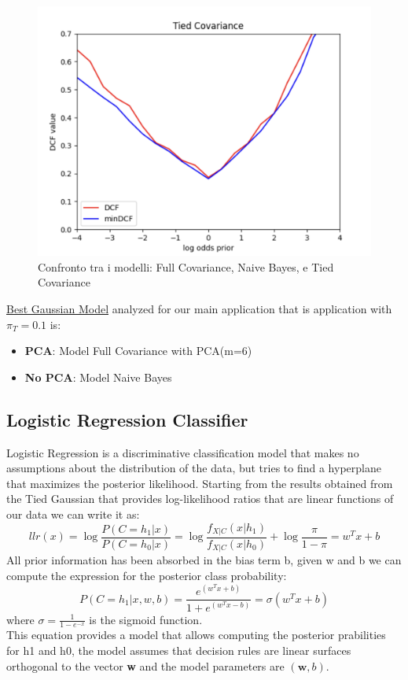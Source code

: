 \documentclass{article}
\begin{document}
\begin{figure}[H]
\begin{minipage}{.3\textwidth}
        \includegraphics[width=\linewidth]{./img/tied.png}
    \end{minipage}
    \caption{Confronto tra i modelli: Full Covariance, Naive Bayes, e Tied Covariance} %
    \label{fig:models_comparison} %
\end{figure}
\underline{Best Gaussian Model} analyzed for our main application that is application with \(\pi_T=0.1\) is:
\begin{itemize}
    \item \textbf{PCA}: Model Full Covariance with PCA(m=6)
    \item \textbf{No PCA}: Model Naive Bayes 
\end{itemize}
\subsection{Logistic Regression Classifier}
Logistic Regression is a discriminative classification model that makes no assumptions about the distribution of the data, but tries to find a hyperplane that maximizes the posterior likelihood. 
Starting from the results obtained from the Tied Gaussian that provides log-likelihood ratios that are linear functions of our data we can write it as:
\begin{equation}
    llr(x) =\log{\frac{P(C=h_1|x)}{P(C=h_0|x)}}=\log{\frac{f_{X|C}(x|h_1)}{f_{X|C}(x|h_0)}}+\log{\frac{\pi}{1-\pi}}= w^Tx + b
\end{equation}
All prior information has been absorbed in the bias term b, given w and b we can compute the expression for the posterior class probability:
\begin{equation}
    P(C=h_1|x,w,b)=\frac{e^{(w^Tx+b)}}{1+e^{(w^Tx-b)}}=\sigma(w^Tx+b)
\end{equation}
where \(\sigma=\frac{1}{1-e^{-x}}\) is the sigmoid function.\\
This equation provides a model that allows computing the posterior prabilities for h1 and h0, the model assumes that decision rules are linear surfaces orthogonal to the vector \textbf{w} and the model parameters are \((\textbf{w},b)\).
\end{document}
